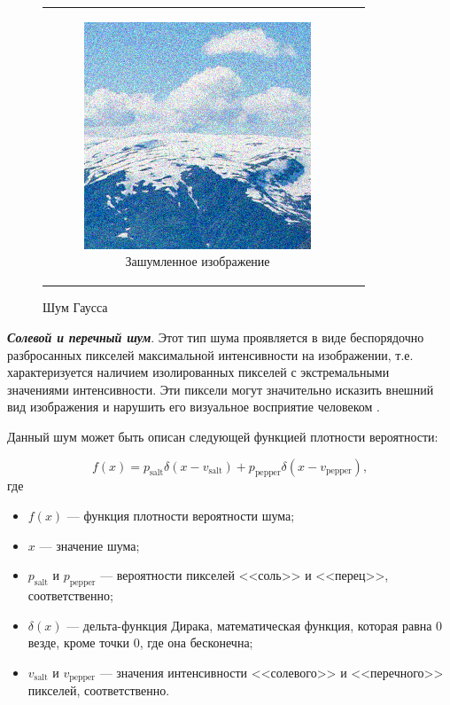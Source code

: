 \begin{figure}[h!]
\begin{tabular}{cc}
\begin{subfigure}{0.45\textwidth}
      \includegraphics[width=\linewidth]{inc/analysis/noises/gaussian.png}
      \caption{Зашумленное изображение}
    \end{subfigure} \\
  \end{tabular}
  \caption{Шум Гаусса}
  \label{fig:gaussian_noise}
\end{figure}

\textit{\textbf{Солевой и перечный шум}}. Этот тип шума проявляется в виде беспорядочно разбросанных пикселей максимальной интенсивности на изображении, т.е. характеризуется наличием изолированных пикселей с экстремальными значениями интенсивности. Эти пиксели могут значительно исказить внешний вид изображения и нарушить его визуальное восприятие человеком \cite{noisetypes}.

Данный шум может быть описан следующей функцией плотности вероятности:

\noindent
\begin{equation}
    f(x) = p_{\text{salt}} \delta(x - v_{\text{salt}}) + p_{\text{pepper}} \delta(x - v_{\text{pepper}}),
\end{equation}
где
\begin{itemize}
    \item $f(x)$ --- функция плотности вероятности шума;
    \item $x$ --- значение шума;
    \item $p_{\text{salt}}$ и $p_{\text{pepper}}$ --- вероятности пикселей <<соль>> и <<перец>>, соответственно;
    \item $\delta(x)$ --- дельта-функция Дирака, математическая функция, которая равна 0 везде, кроме точки 0, где она бесконечна;
    \item  $v_{\text{salt}}$ и $v_{\text{pepper}}$ --- значения интенсивности <<солевого>> и <<перечного>> пикселей, соответственно.
\end{itemize}

